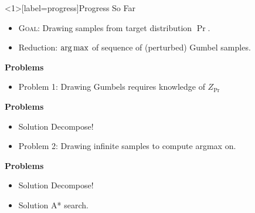 \begin{frame}<1>[label=progress]{Progress So Far}
  
  \begin{itemize}[<+->]
  \item \textsc{Goal}: Drawing samples from target distribution $\Pr$.
  \item Reduction: $\operatorname*{{arg\,max}}$ of sequence of (perturbed) Gumbel samples. %
  \end{itemize}
  \begin{overprint}

    \textbf{Problems}
    \begin{itemize}
    \item {\color{red}Problem 1:} Drawing Gumbels requires knowledge of $Z_{\Pr}$        %
    \end{itemize}

    \textbf{Problems}
    \begin{itemize} 
    \item {\color{blue} Solution} Decompose! %
    \item {\color{red} Problem 2:} Drawing infinite samples to compute argmax on. %
    \end{itemize}

    \textbf{Problems}
    \begin{itemize} 
    \item {\color{blue} Solution} Decompose! %
    \item {\color{blue} Solution} A* search.
    \end{itemize}
  \end{overprint}
\end{frame}


